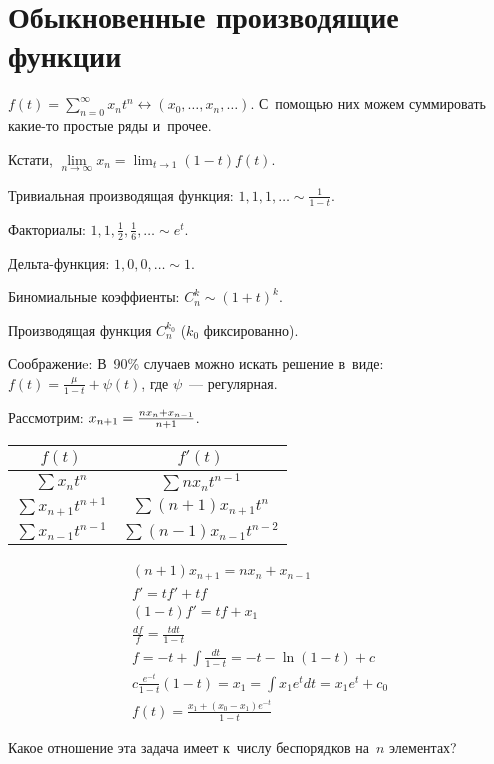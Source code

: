 \documentclass{article}
\begin{document}
\section{Обыкновенные производящие функции}

$f(t) = \sum\limits_{n=0}^\infty x_n t^n \leftrightarrow (x_0, \ldots, x_n,
\ldots)$. С~помощью них можем суммировать какие-то простые ряды и~прочее.

Кстати,
$\lim\limits_{n \rightarrow \infty} x_n = \lim_{t \rightarrow 1} (1-t)f(t)$.

Тривиальная производящая функция: $1, 1, 1, \ldots \sim \frac{1}{1-t}$.

Факториалы: $1, 1, \frac{1}{2}, \frac{1}{6}, \ldots \sim e^t$.

Дельта-функция: $1, 0, 0, \ldots \sim 1$.

Биномиальные коэффиенты: $C_n^k \sim (1 + t)^k$.

\begin{exercise}
	Производящая функция $C_n^{k_0}$ ($k_0$ фиксированно).
\end{exercise}

Соображениe: В~90\% случаев можно искать решение в~виде: $f(t) = \frac{\mu}{1-t}
+ \psi(t)$, где $\psi$~--- регулярная.

Рассмотрим: $x_{n+1} = {nx_n + x_{n-1} \over n + 1}$.

\begin{center}
	\begin{tabular}{|c|c|}
		\hline
		$f(t)$ & $f'(t)$\\
		\hline
		$\sum x_n t^n$ & $\sum nx_n t^{n-1}$\\
		$\sum x_{n+1} t^{n+1}$ & $\sum (n+1)x_{n+1} t^n$\\
		$\sum x_{n-1} t^{n-1}$ & $\sum (n-1)x_{n-1} t^{n-2}$\\
		\hline
	\end{tabular}
\end{center}

\begin{align*}
	(n+1)x_{n+1} = nx_n + x_{n-1}\\
	f' = tf' + tf\\
	(1-t)f' = tf + x_1\\
	\frac{df}{f}= \frac{t dt}{1-t}\\
	f = -t + \int\frac{dt}{1-t} = -t - \ln(1- t) + c\\
	c \frac{e^{-t}}{1-t} (1-t) = x_1 = \int x_1 e^t dt = x_1 e^t + c_0\\
	f(t) = \frac{x_1 + (x_0 - x_1) e^{-t}}{1-t}
\end{align*}

\begin{exercise}
	Какое отношение эта задача имеет к~числу беспорядков на~$n$ элементах?
\end{exercise}
\end{document}
